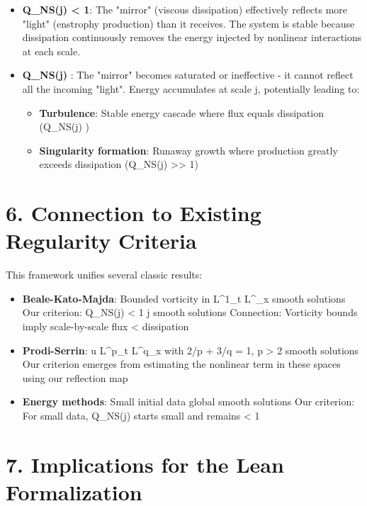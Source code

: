 \documentclass[11pt]{article}
\begin{document}
\begin{itemize}
\item \textbf{Q_{NS}(j) < 1}: The "mirror" (viscous dissipation) effectively reflects more "light" (enstrophy production) than it receives. The system is stable because dissipation continuously removes the energy injected by nonlinear interactions at each scale.

\item \textbf{Q_{NS}(j) }: The "mirror" becomes saturated or ineffective - it cannot reflect all the incoming "light". Energy accumulates at scale j, potentially leading to:
  \begin{itemize}
  \item \textbf{Turbulence}: Stable energy cascade where flux equals dissipation (Q_{NS}(j) )
  \item \textbf{Singularity formation}: Runaway growth where production greatly exceeds dissipation (Q_{NS}(j) >> 1)
  \end{itemize}
\end{itemize}

\section{6. Connection to Existing Regularity Criteria}

This framework unifies several classic results:

\begin{itemize}
\item \textbf{Beale-Kato-Majda}: Bounded vorticity in L^1_t L^\infty_x \Leftrightarrow smooth solutions
  Our criterion: Q_{NS}(j) < 1 \forall j \Leftrightarrow smooth solutions
  Connection: Vorticity bounds imply scale-by-scale flux < dissipation

\item \textbf{Prodi-Serrin}: u \in L^p_t L^q_x with 2/p + 3/q = 1, p > 2 \Leftrightarrow smooth solutions
  Our criterion emerges from estimating the nonlinear term in these spaces using our reflection map

\item \textbf{Energy methods}: Small initial data \Rightarrow global smooth solutions
  Our criterion: For small data, Q_{NS}(j) starts small and remains < 1
\end{itemize}

\section{7. Implications for the Lean Formalization}
\end{document}
